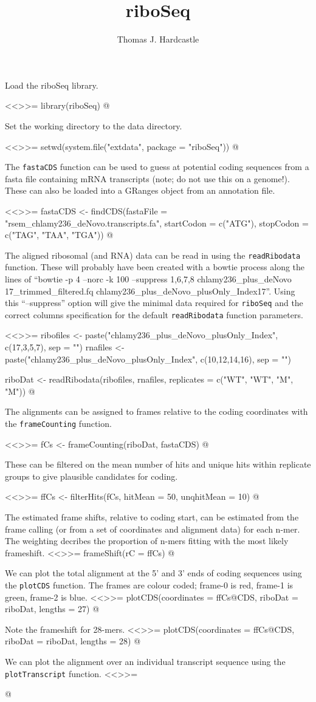 \documentclass[a4paper]{article}
\title{riboSeq}
\author{Thomas J. Hardcastle}
\begin{document}
\maketitle

Load the riboSeq library.

<<>>=
  library(riboSeq)
@

Set the working directory to the data directory.

<<>>=
setwd(system.file("extdata", package = "riboSeq"))
@ 

The \verb'fastaCDS' function can be used to guess at potential coding sequences from a fasta file containing mRNA transcripts (note; do not use this on a genome!). These can also be loaded into a GRanges object from an annotation file.

<<>>=
fastaCDS <- findCDS(fastaFile = "rsem_chlamy236_deNovo.transcripts.fa", startCodon = c("ATG"), stopCodon = c("TAG", "TAA", "TGA"))
@ 

The aligned ribosomal (and RNA) data can be read in using the \verb'readRibodata' function. These will probably have been created with a bowtie process along the lines of ``bowtie -p 4 --norc -k 100 --suppress 1,6,7,8 chlamy236_plus_deNovo 17_trimmed_filtered.fq  chlamy236_plus_deNovo_plusOnly_Index17''. Using this ``--suppress'' option will give the minimal data required for \verb'riboSeq' and the correct columns specification for the default \verb'readRibodata' function parameters.

<<>>=
ribofiles <- paste("chlamy236_plus_deNovo_plusOnly_Index", c(17,3,5,7), sep = "")
rnafiles <- paste("chlamy236_plus_deNovo_plusOnly_Index", c(10,12,14,16), sep = "")

riboDat <- readRibodata(ribofiles, rnafiles, replicates = c("WT", "WT", "M", "M"))
@ 

The alignments can be assigned to frames relative to the coding coordinates with the \verb'frameCounting' function.

<<>>=
fCs <- frameCounting(riboDat, fastaCDS)
@ 

These can be filtered on the mean number of hits and unique hits within replicate groups to give plausible candidates for coding.

<<>>=
ffCs <- filterHits(fCs, hitMean = 50, unqhitMean = 10)
@ 

The estimated frame shifts, relative to coding start, can be estimated from the frame calling (or from a set of coordinates and alignment data) for each n-mer. The weighting decribes the proportion of n-mers fitting with the most likely frameshift.
<<>>=
frameShift(rC = ffCs) 
@ 

We can plot the total alignment at the 5' and 3' ends of coding sequences using the \verb'plotCDS' function. The frames are colour coded; frame-0 is red, frame-1 is green, frame-2 is blue. 
<<>>=
plotCDS(coordinates = ffCs@CDS, riboDat = riboDat, lengths = 27)
@ 

Note the frameshift for 28-mers.
<<>>=
plotCDS(coordinates = ffCs@CDS, riboDat = riboDat, lengths = 28)
@ 


We can plot the alignment over an individual transcript sequence using the \verb'plotTranscript' function.
<<>>=

@ 
\end{document}
